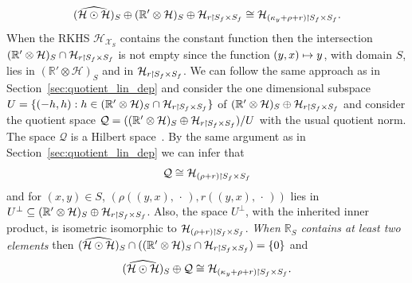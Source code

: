 \documentclass[AHL,Unicode,longabstracts,published]{cedram}
\theoremstyle{remark}
\newcommand{\R}{\mathbb{R}}
\newcommand{\dR}{{\R'}}
\newcommand{\X}{\mathcal{X}}
\newcommand{\cH}{\mathcal{H}}
\newcommand{\clQ}{\mathcal{Q}}
\newcommand*{\mk}{\mkern -1mu}
\let\oldmapsto\mapsto
\renewcommand*{\mapsto}{\mathchoice{\longmapsto}{\oldmapsto}{\oldmapsto}{\oldmapsto}}
\begin{document}
\[
(\widehat{\cH \odot \cH})_S \oplus (\dR \otimes \cH)_S \oplus \cH_{r\mk\upharpoonright\mk S_f \times S_f} \cong
\cH_{(\kappa_y + \rho + r) \mk\upharpoonright\mk S_f \times S_f}.
\]
When the RKHS $\cH_{\X_S}$ contains the constant function then the intersection $(\R' \otimes \cH)_S \cap \cH_{r \mk\upharpoonright\mk S_f \times S_f}$ is not empty since the function $(y,x) \mapsto y$, with domain $S$, lies in $(\R' \otimes \cH)_S$ and in $\cH_{r\mk\upharpoonright\mk S_f \times S_f}$. We can follow the same approach as in Section~\ref{sec:quotient_lin_dep} and consider the one dimensional subspace $U = \{(-h,h) : h \in (\R' \otimes \cH)_S \cap
\cH_{r \mk\upharpoonright\mk S_f \times S_f}\}$ of $(\dR \otimes \cH)_S \oplus \cH_{r\mk\upharpoonright\mk S_f \times S_f}$ and consider the quotient space $\clQ = ((\dR \otimes \cH)_S \oplus \cH_{r\mk\upharpoonright\mk S_f \times S_f}) / U$ with the usual quotient norm. The space $\clQ$ is a Hilbert space~\cite[Section~III.4]{REED72}. By the same argument as in Section~\ref{sec:quotient_lin_dep} we can infer that
\[
\clQ \cong \cH_{(\rho + r)\mk\upharpoonright\mk S_f \times S_f}
\]
and for $(x,y) \in S$, $(\rho((y,x),\,\cdot\,), r((y,x),\,\cdot\,))$ lies in $U^\perp \subseteq (\dR \otimes \cH)_S \oplus \cH_{r\mk\upharpoonright\mk S_f \times S_f}$. Also, the space $U^\perp$, with the inherited inner product, is isometric isomorphic to $\cH_{(\rho + r)\mk\upharpoonright\mk S_f \times S_f}$.
\emph{When $\R_S$ contains at least two elements} then $(\widehat{\cH \odot \cH})_S \cap ((\dR \otimes \cH)_S \cap \cH_{r\mk\upharpoonright\mk S_f \times S_f}) = \{0\}$ and
\[
(\widehat{\cH \odot \cH})_S \oplus \clQ \cong \cH_{(\kappa_y + \rho + r)\mk\upharpoonright\mk S_f \times S_f}.
\]
\end{document}
